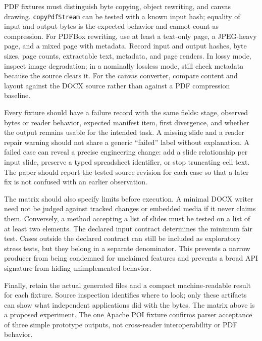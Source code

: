 \documentclass[10pt,letterpaper]{article}
\begin{document}
PDF fixtures must distinguish byte copying, object rewriting, and canvas drawing. \texttt{copyPdfStream} can be tested with a known input hash; equality of input and output bytes is the expected behavior and cannot count as compression. For PDFBox rewriting, use at least a text-only page, a JPEG-heavy page, and a mixed page with metadata. Record input and output hashes, byte sizes, page counts, extractable text, metadata, and page renders. In lossy mode, inspect image degradation; in a nominally lossless mode, still check metadata because the source clears it. For the canvas converter, compare content and layout against the DOCX source rather than against a PDF compression baseline.

Every fixture should have a failure record with the same fields: stage, observed bytes or reader behavior, expected manifest item, first divergence, and whether the output remains usable for the intended task. A missing slide and a reader repair warning should not share a generic ``failed'' label without explanation. A failed case can reveal a precise engineering change: add a slide relationship per input slide, preserve a typed spreadsheet identifier, or stop truncating cell text. The paper should report the tested source revision for each case so that a later fix is not confused with an earlier observation.

The matrix should also specify limits before execution. A minimal DOCX writer need not be judged against tracked changes or embedded media if it never claims them. Conversely, a method accepting a list of slides must be tested on a list of at least two elements. The declared input contract determines the minimum fair test. Cases outside the declared contract can still be included as exploratory stress tests, but they belong in a separate denominator. This prevents a narrow producer from being condemned for unclaimed features and prevents a broad API signature from hiding unimplemented behavior.

Finally, retain the actual generated files and a compact machine-readable result for each fixture. Source inspection identifies where to look; only these artifacts can show what independent applications did with the bytes. The matrix above is a proposed experiment. The one Apache POI fixture confirms parser acceptance of three simple prototype outputs, not cross-reader interoperability or PDF behavior.
\end{document}
